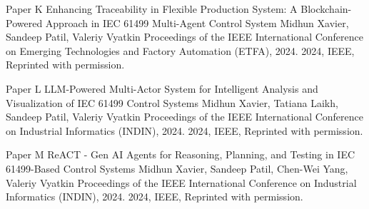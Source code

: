 \documentclass[12pt,a4paper,openright,final,twoside]{cseethesis}
\begin{document}
\def\paperheader{Paper K}
\def\papertitle{Enhancing Traceability in Flexible Production System: A Blockchain-Powered Approach in IEC 61499 Multi-Agent Control System}
\def\paperauthorstring{Midhun Xavier, Sandeep Patil, Valeriy Vyatkin}
\def\referencestring{Proceedings of the IEEE International Conference on Emerging Technologies and Factory Automation (ETFA), 2024.}
\def\copyrightstring{2024, IEEE, Reprinted with permission.}


\makepaperaccepted
  {\paperheader}
  {\papertitle}
  {\paperauthorstring}
  {\referencestring}
  {\copyrightstring}



\def\paperheader{Paper L}
\def\papertitle{LLM-Powered Multi-Actor System for Intelligent Analysis and Visualization of IEC 61499 Control Systems}
\def\paperauthorstring{Midhun Xavier, Tatiana Laikh, Sandeep Patil, Valeriy Vyatkin}
\def\referencestring{Proceedings of the IEEE International Conference on Industrial Informatics (INDIN), 2024.}
\def\copyrightstring{2024, IEEE, Reprinted with permission.}


\makepaperaccepted
  {\paperheader}
  {\papertitle}
  {\paperauthorstring}
  {\referencestring}
  {\copyrightstring}



\def\paperheader{Paper M}
\def\papertitle{ReACT - Gen AI Agents for Reasoning, Planning, and Testing in IEC 61499-Based Control Systems}
\def\paperauthorstring{Midhun Xavier, Sandeep Patil, Chen-Wei Yang, Valeriy Vyatkin}
\def\referencestring{Proceedings of the IEEE International Conference on Industrial Informatics (INDIN), 2024.}
\def\copyrightstring{2024, IEEE, Reprinted with permission.}


\makepaperaccepted
  {\paperheader}
  {\papertitle}
  {\paperauthorstring}
  {\referencestring}
  {\copyrightstring}



\printglossary[type=\acronymtype]
\end{document}
